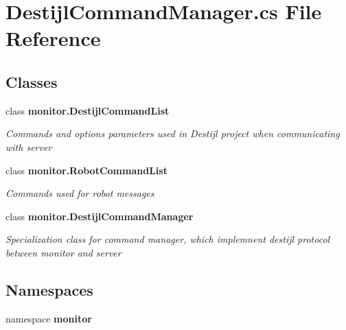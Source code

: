 \section{Destijl\+Command\+Manager.\+cs File Reference}
\label{_destijl_command_manager_8cs}
\subsection*{Classes}
\begin{DoxyCompactItemize}
\item 
class \textbf{ monitor.\+Destijl\+Command\+List}
\begin{DoxyCompactList}\small\item\em Commands and options parameters used in Destijl project when communicating with server \end{DoxyCompactList}\item 
class \textbf{ monitor.\+Robot\+Command\+List}
\begin{DoxyCompactList}\small\item\em Commands used for robot messages \end{DoxyCompactList}\item 
class \textbf{ monitor.\+Destijl\+Command\+Manager}
\begin{DoxyCompactList}\small\item\em Specialization class for command manager, which implemnent destijl protocol between monitor and server \end{DoxyCompactList}\end{DoxyCompactItemize}
\subsection*{Namespaces}
\begin{DoxyCompactItemize}
\item 
namespace \textbf{ monitor}
\end{DoxyCompactItemize}
